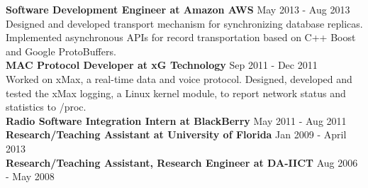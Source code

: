 \begin{resume}
\textbf{Software Development Engineer at Amazon AWS} \hfill May 2013 - Aug 2013\\
Designed and developed transport mechanism for synchronizing database replicas. Implemented asynchronous APIs for record transportation based on C++ Boost and Google ProtoBuffers.\\
\textbf{MAC Protocol Developer at xG Technology} \hfill Sep 2011 - Dec 2011\\
Worked on xMax, a real-time data and voice protocol. Designed, developed and tested the xMax logging, a Linux kernel module, to report network status and statistics to /proc.\\
\textbf{Radio Software Integration Intern at BlackBerry} \hfill May 2011 - Aug 2011\\
\textbf{Research/Teaching Assistant at University of Florida} \hfill Jan 2009 - April 2013\\
\textbf{Research/Teaching Assistant, Research Engineer at DA-IICT} \hfill Aug 2006 - May 2008

\begin{formatb}
  \\
  \body\\
\end{formatb}


\end{resume}
